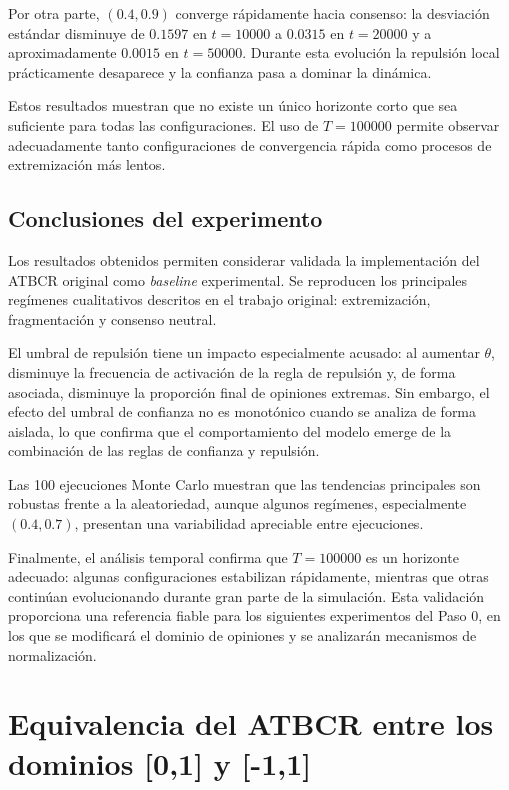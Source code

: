 \documentclass[11pt,a4paper]{article}
\begin{document}
Por otra parte, $(0.4,0.9)$ converge rápidamente hacia consenso: la desviación estándar disminuye de $0.1597$ en $t=10000$ a $0.0315$ en $t=20000$ y a aproximadamente $0.0015$ en $t=50000$. Durante esta evolución la repulsión local prácticamente desaparece y la confianza pasa a dominar la dinámica.

Estos resultados muestran que no existe un único horizonte corto que sea suficiente para todas las configuraciones. El uso de $T=100000$ permite observar adecuadamente tanto configuraciones de convergencia rápida como procesos de extremización más lentos.

\subsection{Conclusiones del experimento}

Los resultados obtenidos permiten considerar validada la implementación del ATBCR original como \emph{baseline} experimental. Se reproducen los principales regímenes cualitativos descritos en el trabajo original: extremización, fragmentación y consenso neutral.

El umbral de repulsión tiene un impacto especialmente acusado: al aumentar $\theta$, disminuye la frecuencia de activación de la regla de repulsión y, de forma asociada, disminuye la proporción final de opiniones extremas. Sin embargo, el efecto del umbral de confianza no es monotónico cuando se analiza de forma aislada, lo que confirma que el comportamiento del modelo emerge de la combinación de las reglas de confianza y repulsión.

Las 100 ejecuciones Monte Carlo muestran que las tendencias principales son robustas frente a la aleatoriedad, aunque algunos regímenes, especialmente $(0.4,0.7)$, presentan una variabilidad apreciable entre ejecuciones.

Finalmente, el análisis temporal confirma que $T=100000$ es un horizonte adecuado: algunas configuraciones estabilizan rápidamente, mientras que otras continúan evolucionando durante gran parte de la simulación. Esta validación proporciona una referencia fiable para los siguientes experimentos del Paso 0, en los que se modificará el dominio de opiniones y se analizarán mecanismos de normalización.

\section{Equivalencia del ATBCR entre los dominios [0,1] y [-1,1]}
\end{document}
